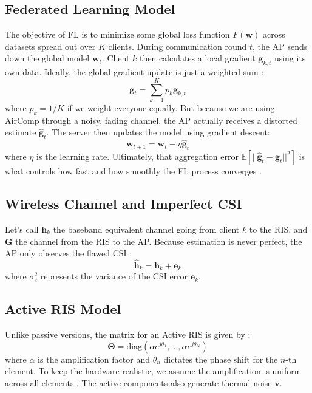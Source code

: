 \documentclass[journal, twocolumn]{IEEEtran}
\begin{document}
\subsection{Federated Learning Model}
The objective of FL is to minimize some global loss function $F(\mathbf{w})$ across datasets spread out over $K$ clients. During communication round $t$, the AP sends down the global model $\mathbf{w}_t$. Client $k$ then calculates a local gradient $\mathbf{g}_{k,t}$ using its own data. Ideally, the global gradient update is just a weighted sum \cite{kim2024federated}:
\begin{equation}
    \mathbf{g}_t = \sum_{k=1}^K p_k \mathbf{g}_{k,t}
\end{equation}
where $p_k = 1/K$ if we weight everyone equally. But because we are using AirComp through a noisy, fading channel, the AP actually receives a distorted estimate $\mathbf{\hat{g}}_t$. The server then updates the model using gradient descent:
\begin{equation}
    \mathbf{w}_{t+1} = \mathbf{w}_t - \eta \mathbf{\hat{g}}_t
\end{equation}
where $\eta$ is the learning rate. Ultimately, that aggregation error $\mathbb{E}[||\mathbf{\hat{g}}_t - \mathbf{g}_t||^2]$ is what controls how fast and how smoothly the FL process converges \cite{cao2022transmission}.

\subsection{Wireless Channel and Imperfect CSI}
Let’s call $\mathbf{h}_{k}$ the baseband equivalent channel going from client $k$ to the RIS, and $\mathbf{G}$ the channel from the RIS to the AP. Because estimation is never perfect, the AP only observes the flawed CSI \cite{zhou2023channel}:
\begin{equation}
    \hat{\mathbf{h}}_{k} = \mathbf{h}_{k} + \mathbf{e}_{k}
\end{equation}
where $\sigma_e^2$ represents the variance of the CSI error $\mathbf{e}_k$.

\subsection{Active RIS Model}
Unlike passive versions, the matrix for an Active RIS is given by \cite{yu2023active}:
\begin{equation}
    \mathbf{\Theta} = \text{diag}(\alpha e^{j\theta_1}, \dots, \alpha e^{j\theta_N})
\end{equation}
where $\alpha$ is the amplification factor and $\theta_n$ dictates the phase shift for the $n$-th element. To keep the hardware realistic, we assume the amplification is uniform across all elements \cite{zhu2020broadband}. The active components also generate thermal noise $\mathbf{v}$.
\end{document}
